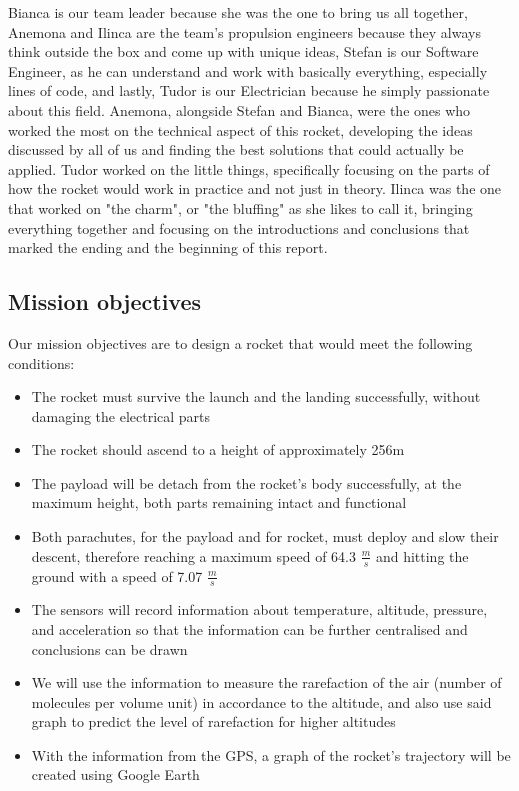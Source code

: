 Bianca is our team leader because she was the one to bring us all together, Anemona and Ilinca are the team's propulsion engineers because they always think outside the box and come up with unique ideas, Stefan is our Software Engineer, as he can understand and work with basically everything, especially lines of code, and lastly, Tudor is our Electrician because he simply passionate about this field.  Anemona, alongside Stefan and Bianca, were the ones who worked the most on the technical aspect of this rocket, developing the ideas discussed by all of us and finding the best solutions that could actually be applied. Tudor worked on the little things, specifically focusing on the parts of how the rocket would work in practice and not just in theory. Ilinca was the one that worked on "the charm", or "the bluffing" as she likes to call it, bringing everything together and focusing on the introductions and conclusions that marked the ending and the beginning of this report.

\subsection{Mission objectives}

Our mission objectives are to design a rocket that would meet the following conditions:

\begin{itemize}
  \item The rocket must survive the launch and the landing successfully, without damaging the electrical parts
  \item The rocket should ascend to a height of approximately 256m 
  \item The payload will be detach from the rocket’s body successfully, at the maximum height, both parts remaining intact and functional
  \item Both parachutes, for the payload and for rocket, must deploy and slow their descent, therefore reaching a maximum speed of 64.3 $ \frac{m}{s} $ and hitting the ground with a speed of 7.07 $ \frac{m}{s} $
  \item The sensors will record information about temperature, altitude, pressure, and acceleration so that the information can be further centralised and conclusions can be drawn
  \item We will use the information to measure the rarefaction of the air (number of molecules per volume unit) in accordance to the altitude, and also use said graph to predict the level of rarefaction for higher altitudes
  \item With the information from the GPS, a graph of the rocket’s trajectory will be created using Google Earth
\end{itemize}
